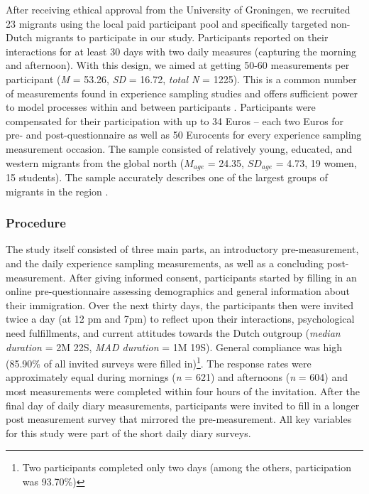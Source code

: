 \documentclass[man, 12pt, a4paper]{apa7}
\theoremstyle{break}
\theoremstyle{plain}
\begin{document}
After receiving ethical approval from the University of Groningen, we
recruited 23 migrants using the local paid participant pool and
specifically targeted non-Dutch migrants to participate in our study.
Participants reported on their interactions for at least 30 days with
two daily measures (capturing the morning and afternoon). With this
design, we aimed at getting 50-60 measurements per participant
(\textit{M} = 53.26, \textit{SD} = 16.72, \textit{total N} = 1225). This
is a common number of measurements found in experience sampling studies
and offers sufficient power to model processes within and between
participants \citep[e.g., for a systematic review see][]{AanhetRot2012}.
Participants were compensated for their participation with up to 34
Euros -- each two Euros for pre- and post-questionnaire as well as 50
Eurocents for every experience sampling measurement occasion. The sample
consisted of relatively young, educated, and western migrants from the
global north (\(M_{age}\) = 24.35, \(SD_{age}\) = 4.73, 19 women, 15
students). The sample accurately describes one of the largest groups of
migrants in the region \citep[][]{GemeenteGroningen2015}.

\subsubsection{Procedure}

The study itself consisted of three main parts, an introductory
pre-measurement, and the daily experience sampling measurements, as well
as a concluding post-measurement. After giving informed consent,
participants started by filling in an online pre-questionnaire assessing
demographics and general information about their immigration. Over the
next thirty days, the participants then were invited twice a day (at 12
pm and 7pm) to reflect upon their interactions, psychological need
fulfillments, and current attitudes towards the Dutch outgroup
(\textit{median duration} = 2M 22S, \textit{MAD duration} = 1M 19S).
General compliance was high (85.90\% of all invited surveys were filled
in)\footnote{Two participants completed only two days (among the others, participation was 93.70\%)}.
The response rates were approximately equal during mornings (\textit{n}
= 621) and afternoons (\textit{n} = 604) and most measurements were
completed within four hours of the invitation. After the final day of
daily diary measurements, participants were invited to fill in a longer
post measurement survey that mirrored the pre-measurement. All key
variables for this study were part of the short daily diary surveys.
\end{document}
